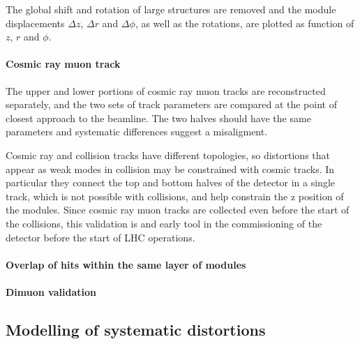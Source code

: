 The global shift and rotation of large structures are removed and the module displacements
$\Delta z$, $\Delta r$ and $\Delta \phi$, as well as the rotations,
are plotted as function of $z$, $r$ and $\phi$.

\paragraph{Cosmic ray muon track\\} %
The upper and lower portions of cosmic ray muon tracks are reconstructed separately,
and the two sets of track parameters are compared at the point of closest approach to the beamline.
The two halves should have the same parameters and systematic differences suggest a misaligment.

Cosmic ray and collision tracks have different topologies, so distortions that appear as
weak modes in collision may be constrained with cosmic tracks.
In particular they connect the top and bottom halves of the detector in a single track,
which is not possible with collisions, and help constrain the z position of the modules.
Since cosmic ray muon tracks are collected even before the start of the collisions,
this validation is and early tool in the commissioning of the detector before the start of LHC operations.

\paragraph{Overlap of hits within the same layer of modules\\}

\paragraph{Dimuon validation\\}

\subsection{Modelling of systematic distortions}

\cite{CMS-TRK-20-001}
